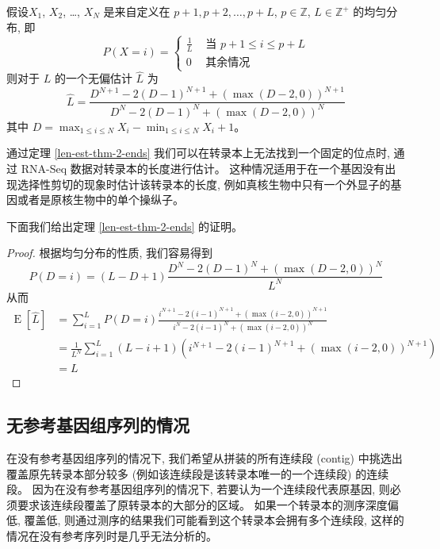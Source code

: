 \begin{thm}
\label{len-est-thm-2-ends}
假设$X_1$, $X_2$, \ldots, $X_N$ 是来自定义在 
${p+1, p+2, \ldots , p+L}$, $p \in \mathbb{Z}$, $L \in \mathbb{Z}^+$ 的均匀分布, 
即 
\[
P(X = i) =  \begin{cases}
\frac{1}{L} & \text{ 当 } p+1 \leq i \leq p+L \\
0 & \text{ 其余情况 }
\end{cases}
\]
则对于 $L$ 的一个无偏估计 $\hat{L}$ 为
\begin{equation}
\label{len-est-thm-2-ends-eq}
\hat{L} = \frac{ D^{N+1} - 2 (D-1)^{N+1} + (\max(D-2, 0))^{N+1} }{ D^{N} - 2 (D-1)^{N} + (\max(D-2, 0))^{N} }
\end{equation}
其中 $D = \max_{1 \leq i \leq N} X_i - \min_{1 \leq i \leq N} X_i +1$。 
\end{thm}

通过定理 \ref{len-est-thm-2-ends} 我们可以在转录本上无法找到一个固定的位点时, 
通过 RNA-Seq 数据对转录本的长度进行估计。 
这种情况适用于在一个基因没有出现选择性剪切的现象时估计该转录本的长度, 
例如真核生物中只有一个外显子的基因或者是原核生物中的单个操纵子。 

下面我们给出定理 \ref{len-est-thm-2-ends} 的证明。 

\begin{proof}
根据均匀分布的性质, 我们容易得到
\[
P(D=i) = (L-D +1) \frac{ D^N - 2 (D-1)^N  + (\max(D-2,0))^N}{ L^N }
\]
从而
\begin{align*}
\operatorname{E}[\hat{L}] &= \sum_{i=1}^L P(D=i) 
    \frac{i^{N+1}-2(i-1)^{N+1}+(\max(i-2,0))^{N+1}}{i^N-2(i-1)^N+(\max(i-2,0))^N} \\
&= \frac{1}{L^N} \sum_{i=1}^L (L-i+1)(i^{N+1}-2(i-1)^{N+1}+(\max(i-2,0))^{N+1}) \\
&= L
\end{align*}

\end{proof}

\subsection{无参考基因组序列的情况}
\nocite{ewens2005statistical} 

在没有参考基因组序列的情况下, 我们希望从拼装的所有连续段 (contig) 
中挑选出覆盖原先转录本部分较多 (例如该连续段是该转录本唯一的一个连续段) 的连续段。 
因为在没有参考基因组序列的情况下, 若要认为一个连续段代表原基因, 
则必须要求该连续段覆盖了原转录本的大部分的区域。 
如果一个转录本的测序深度偏低, 覆盖低, 
则通过测序的结果我们可能看到这个转录本会拥有多个连续段, 
这样的情况在没有参考序列时是几乎无法分析的。

